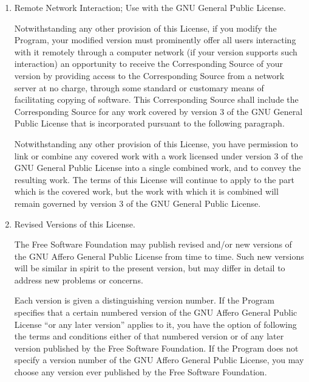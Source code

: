 \documentclass[11pt]{article}
\begin{document}
\begin{enumerate}
    \item Remote Network Interaction; Use with the GNU General Public License.

          Notwithstanding any other provision of this License, if you modify the
          Program, your modified version must prominently offer all users interacting
          with it remotely through a computer network (if your version supports such
          interaction) an opportunity to receive the Corresponding Source of your
          version by providing access to the Corresponding Source from a network
          server at no charge, through some standard or customary means of
          facilitating copying of software.  This Corresponding Source shall include
          the Corresponding Source for any work covered by version 3 of the GNU
          General Public License that is incorporated pursuant to the following
          paragraph.

          Notwithstanding any other provision of this License, you have permission to
          link or combine any covered work with a work licensed under version 3 of
          the GNU General Public License into a single combined work, and to convey
          the resulting work.  The terms of this License will continue to apply to
          the part which is the covered work, but the work with which it is combined
          will remain governed by version 3 of the GNU General Public License.

    \item Revised Versions of this License.

          The Free Software Foundation may publish revised and/or new versions of
          the GNU Affero General Public License from time to time.  Such new versions will
          be similar in spirit to the present version, but may differ in detail to
          address new problems or concerns.

          Each version is given a distinguishing version number.  If the
          Program specifies that a certain numbered version of the GNU Affero General
          Public License ``or any later version'' applies to it, you have the
          option of following the terms and conditions either of that numbered
          version or of any later version published by the Free Software
          Foundation.  If the Program does not specify a version number of the
          GNU Affero General Public License, you may choose any version ever published
          by the Free Software Foundation.


\end{enumerate}
\end{document}
